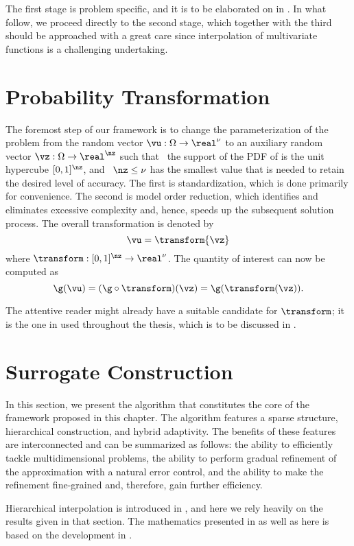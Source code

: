 The first stage is problem specific, and it is to be elaborated on in
. In what follow, we proceed directly to the
second stage, which together with the third should be approached with a great
care since interpolation of multivariate functions is a challenging undertaking.

\section{Probability Transformation}

The foremost step of our framework is to change the parameterization of the
problem from the random vector $\vu: \Omega \to \real^\nu$ to an auxiliary
random vector $\vz: \Omega \to \real^\nz$ such that \one~the support of the
\ac{PDF} of \vz is the unit hypercube $[0, 1]^\nz$, and \two~$\nz \leq \nu$ has
the smallest value that is needed to retain the desired level of accuracy. The
first is standardization, which is done primarily for convenience. The second is
model order reduction, which identifies and eliminates excessive complexity and,
hence, speeds up the subsequent solution process. The overall transformation is
denoted by
\[
  \vu = \transform{\vz}
\]
where $\transform: [0, 1]^\nz \to \real^\nu$. The quantity of interest \g can
now be computed as
\[
  \g(\vu) = (\g \circ \transform)(\vz) = \g(\transform(\vz)).
\]

The attentive reader might already have a suitable candidate for $\transform$;
it is the one in  used throughout the thesis,
which is to be discussed in .

\section{Surrogate Construction}

In this section, we present the algorithm that constitutes the core of the
framework proposed in this chapter. The algorithm features a sparse structure,
hierarchical construction, and hybrid adaptivity. The benefits of these features
are interconnected and can be summarized as follows: the ability to efficiently
tackle multidimensional problems, the ability to perform gradual refinement of
the approximation with a natural error control, and the ability to make the
refinement fine-grained and, therefore, gain further efficiency.

Hierarchical interpolation is introduced in , and
here we rely heavily on the results given in that section. The mathematics
presented in  as well as here is based on the
development in \cite{klimke2006, ma2009, jakeman2012}.

